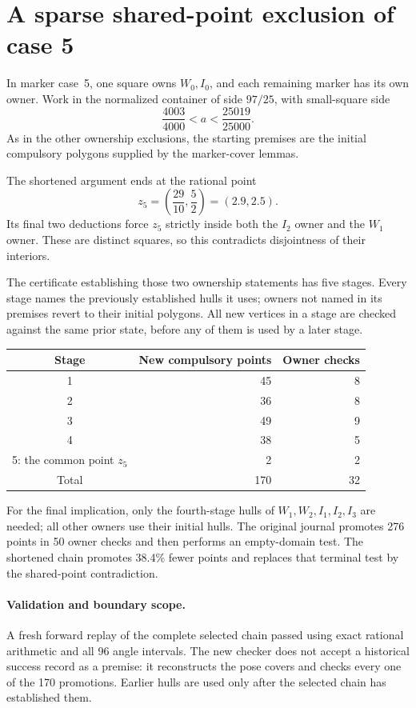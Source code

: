 \documentclass[11pt]{article}
\begin{document}
\section{A sparse shared-point exclusion of case 5}
\label{sec:sparse-case-five}

In marker case~5, one square owns $W_0,I_0$, and each remaining marker
has its own owner.  Work in the normalized container of side $97/25$, with
small-square side
\[
 \frac{4003}{4000}<a<\frac{25019}{25000}.
\]
As in the other ownership exclusions, the starting premises are the
initial compulsory polygons supplied by the marker-cover lemmas.

The shortened argument ends at the rational point
\[
 z_5=\left(\frac{29}{10},\frac52\right)=(2.9,2.5).
\]
Its final two deductions force $z_5$ strictly inside both the $I_2$ owner
and the $W_1$ owner.  These are distinct squares, so this contradicts
disjointness of their interiors.

The certificate establishing those two ownership statements has five
stages.  Every stage names the previously established hulls it uses;
owners not named in its premises revert to their initial polygons.
All new vertices in a stage are checked against the same prior state,
before any of them is used by a later stage.
\begin{center}
\begin{tabular}{c r r}
Stage & New compulsory points & Owner checks\\
\hline
1 & 45 & 8\\
2 & 36 & 8\\
3 & 49 & 9\\
4 & 38 & 5\\
5: the common point $z_5$ & 2 & 2\\
\hline
Total & 170 & 32
\end{tabular}
\end{center}
For the final implication, only the fourth-stage hulls of
$W_1,W_2,I_1,I_2,I_3$ are needed; all other owners use their initial hulls.
The original journal promotes 276 points in 50 owner checks and then
performs an empty-domain test.  The shortened chain promotes 38.4\% fewer
points and replaces that terminal test by the shared-point contradiction.

\paragraph{Validation and boundary scope.}
A fresh forward replay of the complete selected chain passed using exact
rational arithmetic and all 96 angle intervals.  The new checker does not
accept a historical success record as a premise: it reconstructs the pose
covers and checks every one of the 170 promotions.  Earlier hulls are used
only after the selected chain has established them.
\end{document}

